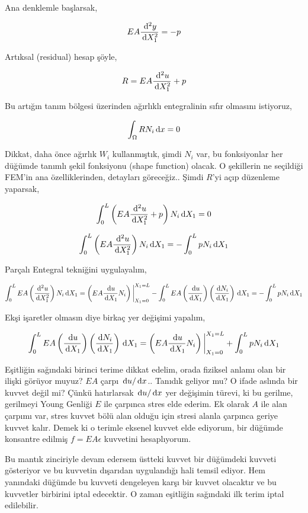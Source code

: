 \documentclass[12pt,fleqn]{article}\usepackage{../../common}
\begin{document}
Ana denklemle başlarsak,

$$
E A \frac{\,\mathrm{d}^2 y}{\,\mathrm{d} X_1^2} = -p
$$

Artıksal (residual) hesap şöyle,

$$
R = EA \frac{\,\mathrm{d}^2 u}{\,\mathrm{d} X_1^2} + p
$$

Bu artığın tanım bölgesi üzerinden ağırlıklı entegralinin sıfır olmasını
istiyoruz,

$$
\int_\Omega R N_i \,\mathrm{d} x = 0 
$$

Dikkat, daha önce ağırlık $W_i$ kullanmıştık, şimdi $N_i$ var, bu fonksiyonlar
her düğümde tanımlı şekil fonksiyonu (shape function) olacak. O şekillerin ne
seçildiği FEM'in ana özelliklerinden, detayları göreceğiz.. Şimdi $R$'yi açıp
düzenleme yaparsak,

$$
\int_{0}^{L} \left( EA \frac{\,\mathrm{d}^2 u}{\,\mathrm{d} X_1^2} + p  \right) N_i \,\mathrm{d} X_1 = 0 
$$

$$
\int_{0}^{L} \left( EA \frac{\,\mathrm{d}^2 u}{\,\mathrm{d} X_1^2} \right) N_i \,\mathrm{d} X_1 =
- \int_{0}^{L} p N_i \,\mathrm{d} X_1
$$

Parçalı Entegral tekniğini uygulayalım,

$$
\int_{0}^{L} EA \left( \frac{\,\mathrm{d}^2 u}{\,\mathrm{d} X_1^2}  \right) N_i \,\mathrm{d} X_1 =
\left( EA \frac{\,\mathrm{d} u}{\,\mathrm{d} X_1} N_i \right) \bigg\vert_{X_1=0}^{X_1=L} -
\int_{0}^{L} EA
\left( \frac{\,\mathrm{d} u}{\,\mathrm{d} X_1} \right)
\left( \frac{\,\mathrm{d} N_i}{\,\mathrm{d} X_1} \right) \,\mathrm{d} X_1 =
- \int_{0}^{L} p N_i \,\mathrm{d} X_1
$$

Ekşi işaretler olmasın diye birkaç yer değişimi yapalım,

$$
\int_{0}^{L} EA
\left( \frac{\,\mathrm{d} u}{\,\mathrm{d} X_1} \right)
\left( \frac{\,\mathrm{d} N_i}{\,\mathrm{d} X_1} \right) \,\mathrm{d} X_1
=
\left( EA \frac{\,\mathrm{d} u}{\,\mathrm{d} X_1} N_i \right) \bigg\vert_{X_1=0}^{X_1=L} +
\int_{0}^{L} p N_i \,\mathrm{d} X_1 
$$

Eşitliğin sağındaki birinci terime dikkat edelim, orada fiziksel anlamı olan bir
ilişki görüyor muyuz? $EA$ çarpı $\,\mathrm{d} u / \,\mathrm{d} x$.. Tanıdık geliyor mu?  O ifade
aslında bir kuvvet değil mi? Çünkü hatırlarsak $\,\mathrm{d} u / \,\mathrm{d} x$ yer değişimin
türevi, ki bu gerilme, gerilmeyi Young Genliği $E$ ile çarpınca stres elde
ederim. Ek olarak $A$ ile alan çarpımı var, stres kuvvet bölü alan olduğu için
stresi alanla çarpınca geriye kuvvet kalır. Demek ki o terimle eksenel kuvvet
elde ediyorum, bir düğümde konsantre edilmiş $f = E A \epsilon$ kuvvetini
hesaplıyorum. 

Bu mantık zinciriyle devam edersem üstteki kuvvet bir düğümdeki kuvveti
gösteriyor ve bu kuvvetin dışarıdan uygulandığı hali temsil ediyor. Hem
yanındaki düğümde bu kuvveti dengeleyen karşı bir kuvvet olacaktır ve
bu kuvvetler birbirini iptal edecektir. O zaman eşitliğin sağındaki
ilk terim iptal edilebilir.
\end{document}
